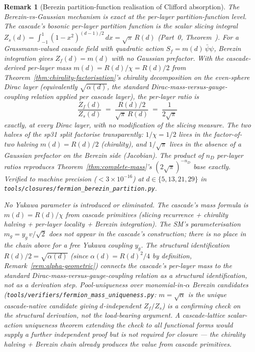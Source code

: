 \documentclass[12pt,a4paper]{article}
\newtheorem*{remark}{Remark}
\begin{document}
\begin{remark}[Berezin partition-function realisation of Clifford absorption]\label{rem:berezin-partition-derivation}
The Berezin-vs-Gaussian mechanism is exact at the per-layer
partition-function level. The cascade's bosonic per-layer partition function is the scalar
slicing integral
$Z_s(d) = \int_{-1}^{1}(1-x^2)^{(d-1)/2}\,dx = \sqrt{\pi}\,R(d)$
(Part~0, Theorem~). For a Grassmann-valued cascade field with
quadratic action $S_f = m(d)\,\bar\psi\psi$, Berezin integration gives
$Z_f(d) = m(d)$ with no Gaussian prefactor. With the cascade-derived
per-layer mass $m(d) = R(d)/\chi = R(d)/2$ from
Theorem~\ref{thm:chirality-factorisation}'s chirality decomposition on
the even-sphere Dirac layer (equivalently $\sqrt{\alpha(d)}$, the
standard Dirac-mass-versus-gauge-coupling relation applied per cascade
layer), the per-layer ratio is
\[
\frac{Z_f(d)}{Z_s(d)}
\;=\;
\frac{R(d)/2}{\sqrt{\pi}\,R(d)}
\;=\;
\frac{1}{2\sqrt{\pi}}
\]
exactly, at every Dirac layer, with no modification of the slicing
measure. The two halves of the sp31 split factorise transparently:
$1/\chi = 1/2$ lives in the factor-of-two halving
$m(d) = R(d)/2$ (chirality), and $1/\sqrt{\pi}$ lives in the absence
of a Gaussian prefactor on the Berezin side (Jacobian). The product of
$n_D$ per-layer ratios reproduces Theorem~\ref{thm:complete-mass}'s
$(2\sqrt{\pi})^{-n_D}$ base exactly. Verified to machine precision
($<3\times 10^{-16}$) at
$d\in\{5,13,21,29\}$ in
\texttt{tools/closures/fermion\_berezin\_partition.py}.

\medskip\noindent\emph{No Yukawa parameter is introduced or eliminated.}
The cascade's mass formula is $m(d) = R(d)/\chi$ from cascade primitives
(slicing recurrence + chirality halving + per-layer locality + Berezin
integration). The SM's parameterisation $m_g = y_g\,v/\sqrt{2}$ does not
appear in the cascade's construction; there is no place in the chain
above for a free Yukawa coupling $y_g$. The structural identification
$R(d)/2 = \sqrt{\alpha(d)}$ (since $\alpha(d) = R(d)^2/4$ by definition,
Remark~\ref{rem:alpha-geometric}) connects the cascade's per-layer mass
to the standard Dirac-mass-versus-gauge-coupling relation as a structural
identification, not as a derivation step. Pool-uniqueness over
monomial-in-$\alpha$ Berezin candidates
(\texttt{tools/verifiers/fermion\_mass\_uniqueness.py}: $m = \sqrt{\alpha}$
is the unique cascade-native candidate giving $d$-independent $Z_f/Z_s$)
is a confirming check on the structural derivation, not the load-bearing
argument. A cascade-lattice scalar-action uniqueness theorem extending
the check to all functional forms would supply a further independent
proof but is not required for closure --- the chirality halving + Berezin
chain already produces the value from cascade primitives.
\end{remark}
\end{document}
